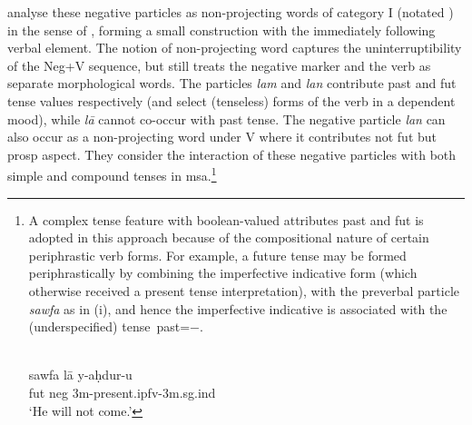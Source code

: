 \documentclass[output=paper,hidelinks]{langscibook}
\begin{document}
\largerpage[-6]%
\citet{AlsharifSadler:09} analyse these negative particles as non-projecting
words of category I (notated ) in the sense of  \citet{Toivonen:NonProj}, forming a small construction with the immediately following verbal element. The notion of non-projecting word captures the uninterruptibility of the Neg+V sequence, but still treats the negative marker and the verb as separate morphological words.  The particles
{\em lam} and {\em lan} contribute  {\sc past} and {\sc fut} tense values respectively (and select (tenseless) forms of the verb in a dependent mood), while {\em l\=a} cannot co-occur with {\sc past} tense. The negative particle {\em lan} can also occur as a non-projecting word under V where it contributes not {\sc fut} but {\sc prosp} aspect. They consider the interaction of these negative particles with both simple and compound tenses in {\sc msa}.\footnote{A complex {\sc tense} feature with boolean-valued attributes {\sc past} and {\sc fut} is adopted in this approach because of the compositional nature of certain periphrastic verb forms. For example, a future tense may be formed periphrastically by combining the imperfective indicative form (which otherwise received a present tense interpretation), with the preverbal particle {\em sawfa} as in (i), and hence the imperfective indicative is associated with the (underspecified) {\sc tense~past}=$-$.

  \citep[82]{FF93} \\
\gll sawfa l\=a y-aḥdur-u\\
{\sc fut} {\sc neg} {\sc 3m-}present.{\sc ipfv}-{\sc 3m.sg.ind}\\
\glt `He will not come.'
\z
}



\ea
{}
\hfill{\citep[14]{AlsharifSadler:09}}
\z




\ea\label{lex-lam}
 \hfill{\citep[16]{AlsharifSadler:09}}
\z
\end{document}
